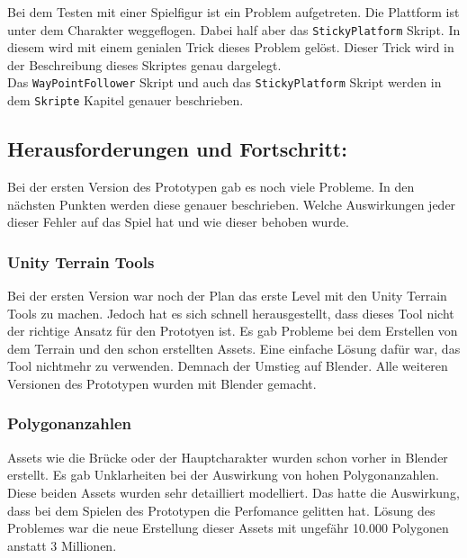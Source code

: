 Bei dem Testen mit einer Spielfigur ist ein Problem aufgetreten. Die Plattform ist unter dem Charakter weggeflogen. Dabei half aber das \verb+StickyPlatform+ Skript. In diesem wird mit einem genialen Trick dieses Problem gelöst. Dieser Trick wird in der Beschreibung dieses Skriptes genau dargelegt.\\

Das \verb+WayPointFollower+ Skript und auch das \verb+StickyPlatform+ Skript werden in dem \verb+Skripte+ Kapitel genauer beschrieben. 

\pagebreak


\subsection{Herausforderungen und Fortschritt:}

Bei der ersten Version des Prototypen gab es noch viele Probleme. In den nächsten Punkten werden diese genauer beschrieben. Welche Auswirkungen jeder dieser Fehler auf das Spiel hat und wie dieser behoben wurde.

\subsubsection{Unity Terrain Tools}
Bei der ersten Version war noch der Plan das erste Level mit den Unity Terrain Tools zu machen. Jedoch hat es sich schnell herausgestellt, dass dieses Tool nicht der richtige Ansatz für den Prototyen ist. Es gab Probleme bei dem Erstellen von dem Terrain und den schon erstellten Assets. Eine einfache Lösung dafür war, das Tool nichtmehr zu verwenden. Demnach der Umstieg auf Blender. Alle weiteren Versionen des Prototypen wurden mit Blender gemacht.

\subsubsection{Polygonanzahlen}
Assets wie die Brücke oder der Hauptcharakter wurden schon vorher in Blender erstellt. Es gab Unklarheiten bei der Auswirkung von hohen Polygonanzahlen. Diese beiden Assets wurden sehr detailliert modelliert. Das hatte die Auswirkung, dass bei dem Spielen des Prototypen die Perfomance gelitten hat. Lösung des Problemes war die neue Erstellung dieser Assets mit ungefähr 10.000 Polygonen anstatt 3 Millionen.

